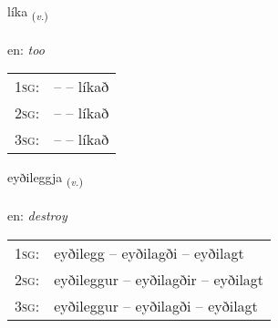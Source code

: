 \documentclass[frontgrid, backgrid]{flacards}\usepackage[]{graphicx}\usepackage[]{xcolor}
\begin{document}
\renewcommand{\flhead}{\vskip5pt \fboxsep=0pt {\small\bfseries\footnotesize Sagnorð | Verb}}
\renewcommand{\fcfoot}{\vskip5pt \fboxsep=0pt \hspace{2pt}{\small\bfseries\footnotesize 3K}}

\renewcommand{\blhead}{\vskip5pt {\small\bfseries\footnotesize Sagnorð | Verb }}
\renewcommand{\bcfoot}{\vskip5pt \hspace{2pt}{\small\bfseries\footnotesize 3K}}


{líka \small{\textsubscript{(\textit{v.})}} \\[1ex] %
\textphonetic{[liːka]} \\
en: \emph{too} \\  [2ex]
\renewcommand*{\arraystretch}{0.8}
\begin{tabular}{p{1cm}l}
\textsc{1sg}: &  --  -- líkað \\ 
\textsc{2sg}: &  --  -- líkað \\ 
\textsc{3sg}: &  --  -- líkað \\ 
\end{tabular}
}

\renewcommand{\flhead}{\vskip5pt \fboxsep=0pt {\small\bfseries\footnotesize Sagnorð | Verb}}
\renewcommand{\fcfoot}{\vskip5pt \fboxsep=0pt \hspace{2pt}{\small\bfseries\footnotesize 3K}}

\renewcommand{\blhead}{\vskip5pt {\small\bfseries\footnotesize Sagnorð | Verb }}
\renewcommand{\bcfoot}{\vskip5pt \hspace{2pt}{\small\bfseries\footnotesize 3K}}


{eyðileggja \small{\textsubscript{(\textit{v.})}} \\[1ex] %
\textphonetic{[eiːðɪlɛca]} \\
en: \emph{destroy} \\  [2ex]
\renewcommand*{\arraystretch}{0.8}
\begin{tabular}{p{1cm}l}
\textsc{1sg}: & eyðilegg -- eyðilagði -- eyðilagt \\ 
\textsc{2sg}: & eyðileggur -- eyðilagðir -- eyðilagt \\ 
\textsc{3sg}: & eyðileggur -- eyðilagði -- eyðilagt \\ 
\end{tabular}
}
\end{document}
